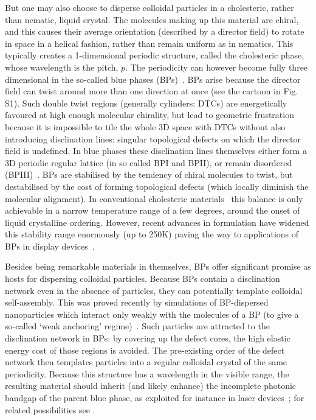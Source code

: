 \documentclass[12pt]{article}
\begin{document}
But one may also choose to disperse colloidal particles in a cholesteric, 
rather than nematic, liquid crystal. The molecules making up this material are
chiral, and this causes their average orientation (described by a director field) to rotate in space in
a helical fashion, rather than remain uniform as in nematics. 
This typically creates a 1-dimensional periodic structure, called the cholesteric phase, whose wavelength 
is the pitch, $p$. The periodicity can however become fully three dimensional in the so-called blue phases (BPs)~\cite{mermin}. BPs arise because the director field can twist around more than one direction at once (see 
the cartoon in Fig. S1). Such double twist 
regions (generally cylinders: DTCs) are energetically favoured at high enough molecular chirality, but
lead to geometric frustration because it is impossible to tile the whole 3D
space with DTCs without also introducing disclination lines: singular topological defects on which the director field is undefined. In blue phases these disclination lines themselves either form a 3D periodic regular lattice (in so called BPI and BPII), or remain disordered (BPIII)~\cite{bp3}. 
%
BPs are stabilised by the tendency of chiral molecules to twist, but destabilised by the cost of forming topological defects (which locally diminish the molecular alignment). In conventional cholesteric materials~\cite{mermin} this balance is only achievable in a narrow temperature range of a few degrees, around the onset of liquid crystalline ordering. However, recent advances in formulation have widened this stability range enormously (up to 250K) paving the way to
applications of BPs in display devices~\cite{kikuchi,bplasers,coleswidetrange,bpdevice,coles}.

Besides being remarkable materials in themselves, BPs offer significant promise as hosts for dispersing colloidal particles. Because BPs contain a disclination network even in the absence of
particles, they can potentially template colloidal self-assembly. 
This was proved recently by simulations of BP-dispersed nanoparticles which interact only weakly with the molecules of a BP (to give a so-called `weak anchoring' regime)~\cite{miha}. Such particles are attracted to the disclination network in BPs: by covering up the defect cores, the high elastic energy cost of those regions is avoided. The pre-existing order of the defect network then templates particles into a regular colloidal crystal of the same periodicity. 
Because this structure has a wavelength in the visible range, 
the resulting material should inherit (and likely enhance) the incomplete photonic bandgap of the parent blue phase, as exploited for instance in laser devices~\cite{bplasers}; for related possibilities see \cite{lavrentovich}.
\end{document}
